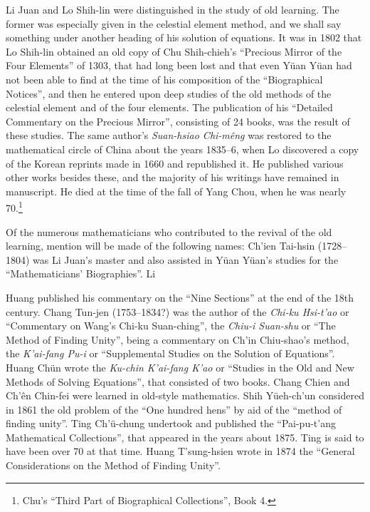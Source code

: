 \documentclass[11pt]{article}
\newcommand{\scanpage}[2]{\clearpage\setcounter{footnote}{0}\noindent{\footnotesize\color{gray}PDF page #1 · #2}\par\medskip}
\newcommand{\scanfooter}{}
\begin{document}
Li Juan and Lo Shih-lin were distinguished in the study of old learning. The former was especially given in the celestial element method, and we shall say something under another heading of his solution of equations. It was in 1802 that Lo Shih-lin obtained an old copy of Chu Shih-chieh's ``Precious Mirror of the Four Elements'' of 1303, that had long been lost and that even Yüan Yüan had not been able to find at the time of his composition of the ``Biographical Notices'', and then he entered upon deep studies of the old methods of the celestial element and of the four elements. The publication of his ``Detailed Commentary on the Precious Mirror'', consisting of 24 books, was the result of these studies. The same author's \emph{Suan-hsiao Chi-mêng} was restored to the mathematical circle of China about the years 1835--6, when Lo discovered a copy of the Korean reprints made in 1660 and republished it. He published various other works besides these, and the majority of his writings have remained in manuscript. He died at the time of the fall of Yang Chou, when he was nearly 70.\footnote{Chu's ``Third Part of Biographical Collections'', Book 4.}

Of the numerous mathematicians who contributed to the revival of the old learning, mention will be made of the following names: Ch'ien Tai-hsin (1728--1804) was Li Juan's master and also assisted in Yüan Yüan's studies for the ``Mathematicians' Biographies''. Li
\scanfooter

\scanpage{0139}{Chapter 18, printed page 125}
Huang published his commentary on the ``Nine Sections'' at the end of the 18th century. Chang Tun-jen (1753--1834?) was the author of the \emph{Chi-ku Hsi-t'ao} or ``Commentary on Wang's Chi-ku Suan-ching'', the \emph{Chiu-i Suan-shu} or ``The Method of Finding Unity'', being a commentary on Ch'in Chiu-shao's method, the \emph{K'ai-fang Pu-i} or ``Supplemental Studies on the Solution of Equations''. Huang Chün wrote the \emph{Ku-chin K'ai-fang K'ao} or ``Studies in the Old and New Methods of Solving Equations'', that consisted of two books. Chang Chien and Ch'ên Chin-fei were learned in old-style mathematics. Shih Yüeh-ch'un considered in 1861 the old problem of the ``One hundred hens'' by aid of the ``method of finding unity''. Ting Ch'ü-chung undertook and published the ``Pai-pu-t'ang Mathematical Collections'', that appeared in the years about 1875. Ting is said to have been over 70 at that time. Huang T'sung-hsien wrote in 1874 the ``General Considerations on the Method of Finding Unity''.
\end{document}
